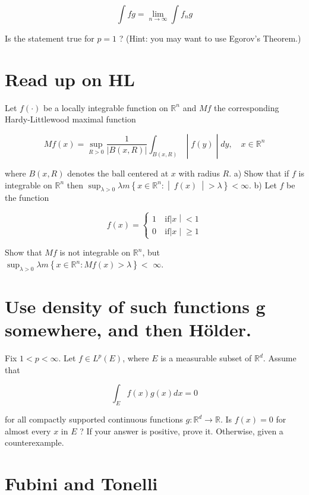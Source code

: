\documentclass{qlnotes-export}
\begin{document}
\[\int fg = \lim\limits_{n\rightarrow\infty}\int f_{n}g\]

Is the statement true for \(p = 1\) ? (Hint: you may want to use Egorov's Theorem.)

\chapter{Read up on HL}\label{read-up-on-hl}

Let \(f( \cdot )\) be a locally integrable function on \({\mathbb{R}}^{n}\) and \(Mf\) the corresponding Hardy-Littlewood maximal function

\[\left. Mf(x) = \sup\limits_{R > 0}\frac{1}{|B(x,R)|}\int_{B(x,R)} \middle| f(y) \middle| dy,\quad x \in {\mathbb{R}}^{n} \right.\]

where \(B(x,R)\) denotes the ball centered at \(x\) with radius \(R\). a) Show that if \(f\) is integrable on \({\mathbb{R}}^{n}\) then \(\sup_{\lambda > 0}\lambda m\left\{ x \in {\mathbb{R}}^{n}: \middle| \ f(x)\  \middle| > \lambda \right\} < \infty\). b) Let \(f\) be the function

\[f(x) = \left\{ \begin{matrix}
{1\ } & {\text{if}\left| x \middle| < 1 \right.} \\
{0\ } & {\text{if}\left| x \middle| \geq 1 \right.}
\end{matrix} \right.\]

Show that \(Mf\) is not integrable on \({\mathbb{R}}^{n}\), but \(\sup_{\lambda > 0}\lambda m\left\{ {x \in {\mathbb{R}}^{n}:Mf(x) > \lambda} \right\} <\) \(\infty\).

\chapter{Use density of such functions g somewhere, and then Hölder.}

Fix \(1 < p < \infty\). Let \(f \in L^{p}(E)\), where \(E\) is a measurable subset of \({\mathbb{R}}^{d}\). Assume that

\[\int_{E}f(x)g(x)dx = 0\]

for all compactly supported continuous functions \(g:{\mathbb{R}}^{d}\rightarrow{\mathbb{R}}\). Is \(f(x) = 0\) for almost every \(x\) in \(E\) ? If your answer is positive, prove it. Otherwise, given a counterexample.

\chapter{Fubini and Tonelli}\label{fubini-and-tonelli}
\end{document}
